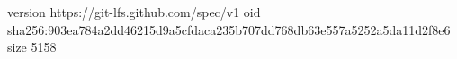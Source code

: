 version https://git-lfs.github.com/spec/v1
oid sha256:903ea784a2dd46215d9a5cfdaca235b707dd768db63e557a5252a5da11d2f8e6
size 5158
